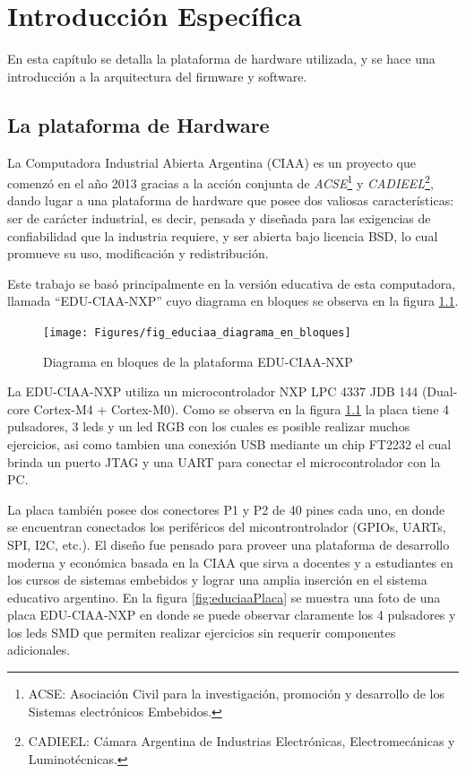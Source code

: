 \chapter{Introducción Específica} %

\label{Chapter2}

En esta capítulo se detalla la plataforma de hardware utilizada, y se hace una introducción a la arquitectura del firmware y software.
\section{La plataforma de Hardware}
\label{sec:plataforma}

La Computadora Industrial Abierta Argentina (CIAA) es un proyecto que comenzó en el año 2013 
gracias a la acción conjunta de \textit{ACSE}\footnote{ACSE: Asociación Civil para la investigación, promoción y desarrollo de los Sistemas electrónicos Embebidos.} y \textit{CADIEEL}\footnote{CADIEEL: Cámara Argentina de Industrias Electrónicas, Electromecánicas y Luminotécnicas.}, dando lugar a una plataforma de hardware que posee dos valiosas características: ser de carácter industrial, es decir, pensada y diseñada para las exigencias de confiabilidad que la industria requiere, y ser abierta bajo licencia BSD, lo cual promueve su uso, modificación y redistribución.

Este trabajo se basó principalmente en la versión educativa de esta computadora, llamada “EDU-CIAA-NXP” cuyo diagrama en bloques se observa en la figura \ref{fig:educiaaBloques}.

\begin{figure}[h]
  \centering
    \texttt{[image: Figures/fig\_educiaa\_diagrama\_en\_bloques]}
  \caption{Diagrama en bloques de la plataforma EDU-CIAA-NXP}
  \label{fig:educiaaBloques}
\end{figure}

La EDU-CIAA-NXP utiliza un microcontrolador NXP LPC 4337 JDB 144 (Dual-core Cortex-M4 + Cortex-M0). Como se observa en la figura \ref{fig:educiaaBloques} la placa tiene 4 pulsadores, 3 leds y un led RGB con los cuales es posible realizar muchos ejercicios, asi como tambien una conexión USB mediante un chip FT2232 el cual brinda un puerto JTAG y una UART para conectar el microcontrolador con la PC.

La placa también posee dos conectores P1 y P2 de 40 pines cada uno, en donde se encuentran conectados los periféricos del micontrontrolador (GPIOs, UARTs, SPI, I2C, etc.). El diseño fue pensado para proveer una plataforma de desarrollo moderna y económica basada en la CIAA que sirva a docentes y a estudiantes en los cursos de sistemas embebidos y lograr una amplia inserción en el sistema educativo argentino.
En la figura \ref{fig:educiaaPlaca} se muestra una foto de una placa EDU-CIAA-NXP en donde se puede observar claramente los 4 pulsadores y los leds SMD que permiten realizar ejercicios sin requerir componentes adicionales.

